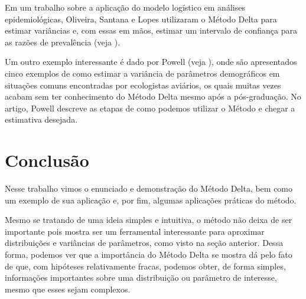 \documentclass{article}
\begin{document}
Em um trabalho sobre a aplicação do modelo logístico em análises epidemiológicas, Oliveira, Santana e Lopes utilizaram o Método Delta para estimar variâncias e, com essas em mãos, estimar um intervalo de confiança para as razões de prevalência (veja \cite{OLIVEIRA1997}).

Um outro exemplo interessante é dado por Powell (veja \cite{10.1093/condor/109.4.949}), onde são apresentados cinco exemplos de como estimar a variância de parâmetros demográficos em situações comuns encontradas por ecologistas aviários, os quais muitas vezes acabam sem ter conhecimento do Método Delta mesmo após a pós-graduação. No artigo, Powell descreve as etapas de como podemos utilizar o Método e chegar a estimativa desejada.

\section*{Conclusão}

Nesse trabalho vimos o enunciado e demonstração do Método Delta, bem como um exemplo de sua aplicação e, por fim, algumas aplicações práticas do método.

Mesmo se tratando de uma ideia simples e intuitiva, o método não deixa de ser importante pois mostra ser um ferramental interessante para aproximar distribuições e variâncias de parâmetros, como visto na seção anterior. Dessa forma, podemos ver que a importância do Método Delta se mostra dá pelo fato de que, com hipóteses relativamente fracas, podemos obter, de forma simples, informações importantes sobre uma distribuição ou parâmetro de interesse, mesmo que esses sejam complexos.

\printbibliography
\end{document}
